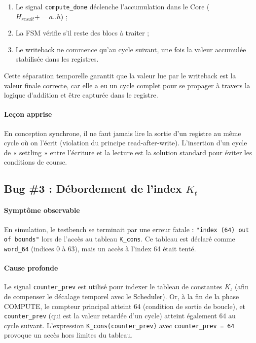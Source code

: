 \begin{enumerate}
    \item Le signal \texttt{compute\_done} déclenche l'accumulation dans le Core ($H_{result} += a..h$) ;
    \item La FSM vérifie s'il reste des blocs à traiter ;
    \item Le writeback ne commence qu'au cycle suivant, une fois la valeur accumulée stabilisée dans les registres.
\end{enumerate}

Cette séparation temporelle garantit que la valeur lue par le writeback est la valeur finale correcte, car elle a eu un cycle complet pour se propager à travers la logique d'addition et être capturée dans le registre.

\paragraph{Leçon apprise} En conception synchrone, il ne faut jamais lire la sortie d'un registre au même cycle où on l'écrit (violation du principe read-after-write). L'insertion d'un cycle de « settling » entre l'écriture et la lecture est la solution standard pour éviter les conditions de course.

\subsection{Bug \#3 : Débordement de l'index $K_t$}

\paragraph{Symptôme observable} En simulation, le testbench se terminait par une erreur fatale : \texttt{"index (64) out of bounds"} lors de l'accès au tableau \texttt{K\_cons}. Ce tableau est déclaré comme \texttt{word\_64} (indices 0 à 63), mais un accès à l'index 64 était tenté.

\paragraph{Cause profonde} Le signal \texttt{counter\_prev} est utilisé pour indexer le tableau de constantes $K_t$ (afin de compenser le décalage temporel avec le Scheduler). Or, à la fin de la phase COMPUTE, le compteur principal atteint 64 (condition de sortie de boucle), et \texttt{counter\_prev} (qui est la valeur retardée d'un cycle) atteint également 64 au cycle suivant. L'expression \texttt{K\_cons(counter\_prev)} avec \texttt{counter\_prev = 64} provoque un accès hors limites du tableau.

